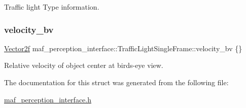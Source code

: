 Traffic light Type information. 

\mbox{\label{structmaf__perception__interface_1_1TrafficLightSingleFrame_aa265a40e79dcb11592772cd516452510}} 
\subsubsection{\texorpdfstring{velocity\+\_\+bv}{velocity\_bv}}
{\footnotesize\ttfamily \hyperlink{structmaf__perception__interface_1_1Vector2f}{Vector2f} maf\+\_\+perception\+\_\+interface\+::\+Traffic\+Light\+Single\+Frame\+::velocity\+\_\+bv \{\}}



Relative velocity of object center at bird\textquotesingle{}s-\/eye view. 



The documentation for this struct was generated from the following file\+:\begin{DoxyCompactItemize}
\item 
\hyperlink{maf__perception__interface_8h}{maf\+\_\+perception\+\_\+interface.\+h}\end{DoxyCompactItemize}
